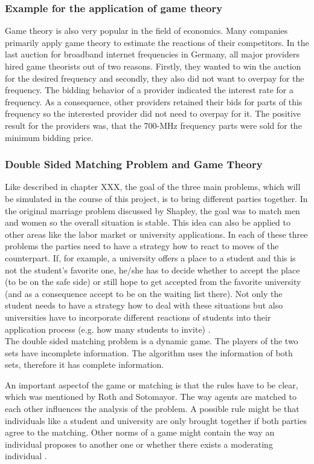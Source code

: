 \subsubsection{Example for the application of game theory}
Game theory is also very popular in the field of economics.
Many companies primarily apply game theory to estimate the reactions of their competitors. 
In the last auction for broadband internet frequencies in Germany, all major providers hired game theorists out of two reasons. 
Firstly, they wanted to win the auction for the desired frequency and secondly, they also did not want to overpay for the frequency.
The bidding behavior of a provider indicated the interest rate for a frequency. 
As a consequence, other providers retained their bids for parts of this frequency so the interested provider did not need to overpay for it. 
The positive result for the providers was, that the 700-MHz frequency parts were sold for the minimum bidding price. \cite{gametheoryWelt}

\subsubsection{Double Sided Matching Problem and Game Theory}

Like described in chapter XXX, the goal of the three main problems, which will be simulated in the course of this project, is to bring different parties together.
In the original marriage problem discussed by Shapley, the goal was to match men and women so the overall situation is stable.
This idea can also be applied to other areas like the labor market or university applications.
In each of these three problems the parties need to have a strategy how to react to moves of the counterpart.
If, for example, a university offers a place to a student and this is not the student's favorite one, he/she has to decide whether to accept the place (to be on the safe side) or still hope to get accepted from the favorite university (and as a consequence accept to be on the waiting list there).
Not only the student needs to have a strategy how to deal with these situations but also universities have to incorporate different reactions of students into their application process (e.g. how many students to invite) \cite{gale62a}. \\
The double sided matching problem is a dynamic game.
The players of the two sets have incomplete information.
The algorithm uses the information of both sets, therefore it has complete information.

An important aspectof the game or matching is that the rules have to be clear, which was mentioned by Roth and Sotomayor.
The way agents are matched to each other influences the analysis of the problem.
A possible rule might be that individuals like a student and university are only brought together if both parties agree to the matching.
Other norms of a game might contain the way an individual proposes to another one or whether there exists a moderating individual \cite[p. 492]{roth1992two}.